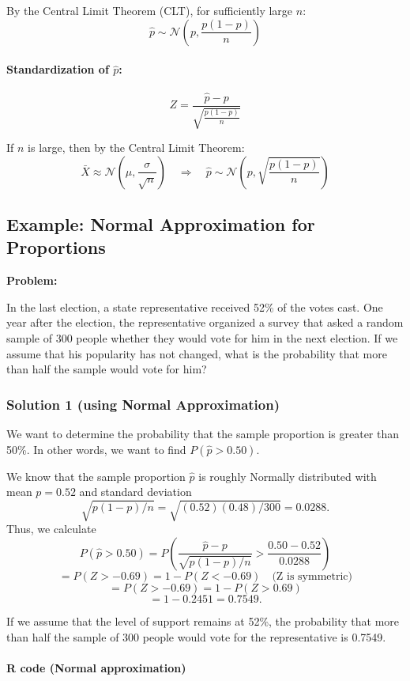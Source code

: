 By the Central Limit Theorem (CLT), for sufficiently large $n$:
\[
\hat{p} \sim \mathcal{N} \left( p, \frac{p(1 - p)}{n} \right)
\]

\paragraph*{Standardization of $\hat{p}$:}
\[
Z = \frac{\hat{p} - p}{\sqrt{ \frac{p(1 - p)}{n} }}
\]

If $n$ is large, then by the Central Limit Theorem:
\[
\bar{X} \approx \mathcal{N} \left( \mu, \frac{\sigma}{\sqrt{n}} \right)
\quad \Rightarrow \quad
\hat{p} \sim \mathcal{N} \left( p, \sqrt{\frac{p(1 - p)}{n}} \right)
\]
\subsection*{Example: Normal Approximation for Proportions}

\textbf{Problem:}

In the last election, a state representative received 52\% of the votes cast. One year after the election, the representative organized a survey that asked a random sample of 300 people whether they would vote for him in the next election. If we assume that his popularity has not changed, what is the probability that more than half the sample would vote for him?

\vspace{1em}
\subsubsection*{Solution 1 (using Normal Approximation)}

We want to determine the probability that the sample proportion is greater than 50\%. In other words, we want to find $P(\hat{p} > 0.50)$.

We know that the sample proportion $\hat{p}$ is roughly Normally distributed with mean $p = 0.52$ and standard deviation
\[
\sqrt{p(1 - p)/n} = \sqrt{(0.52)(0.48)/300} = 0.0288.
\]
Thus, we calculate
\[
P(\hat{p} > 0.50) = P\left( \frac{\hat{p} - p}{\sqrt{p(1-p)/n}} > \frac{0.50 - 0.52}{0.0288} \right)
\]
\[
= P(Z > -0.69) = 1 - P(Z < -0.69) \quad \text{(Z is symmetric)}
\]
\[
= P(Z > -0.69) = 1 - P(Z > 0.69)
\]
\[
= 1 - 0.2451 = 0.7549.
\]

If we assume that the level of support remains at 52\%, the probability that more than half the sample of 300 people would vote for the representative is 0.7549.
\paragraph*{R code (Normal approximation)}

